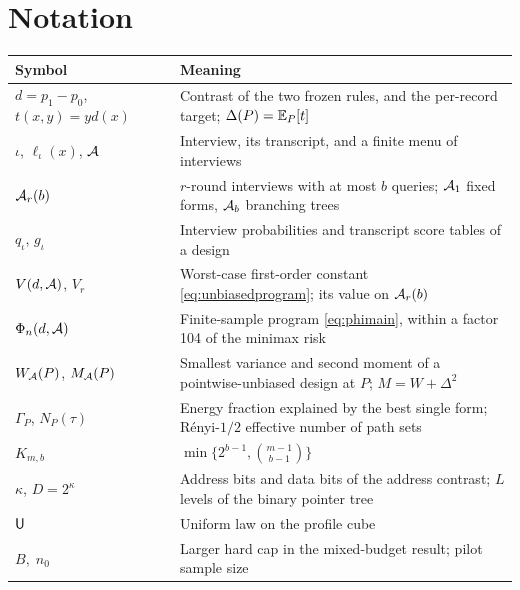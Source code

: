 \section{Notation}\label{app:notation}
\begin{center}\small
\begin{tabular}{lp{10.5cm}}
\toprule
Symbol & Meaning\\
\midrule
$d=p_1-p_0$, $t(x,y)=yd(x)$ & Contrast of the two frozen rules, and the per-record target; $\Delta(P)=\mathbb{E}_P[t]$\\
$\iota$, $\ell_\iota(x)$, $\mathcal A$ & Interview, its transcript, and a finite menu of interviews\\
$\mathcal A_r(b)$ & $r$-round interviews with at most $b$ queries; $\mathcal A_1$ fixed forms, $\mathcal A_b$ branching trees\\
$q_\iota$, $g_\iota$ & Interview probabilities and transcript score tables of a design\\
$V(d,\mathcal A)$, $V_r$ & Worst-case first-order constant \eqref{eq:unbiasedprogram}; its value on $\mathcal A_r(b)$\\
$\Phi_n(d,\mathcal A)$ & Finite-sample program \eqref{eq:phimain}, within a factor 104 of the minimax risk\\
$W_\mathcal A(P)$, $M_\mathcal A(P)$ & Smallest variance and second moment of a pointwise-unbiased design at $P$; $M=W+\Delta^2$\\
$\Gamma_P$, $N_P(\tau)$ & Energy fraction explained by the best single form; R\'enyi-$1/2$ effective number of path sets\\
$K_{m,b}$ & $\min\{2^{b-1},\binom{m-1}{b-1}\}$\\
$\kappa$, $D=2^\kappa$ & Address bits and data bits of the address contrast; $L$ levels of the binary pointer tree\\
$\mathsf U$ & Uniform law on the profile cube\\
$B,\;n_0$ & Larger hard cap in the mixed-budget result; pilot sample size\\
\bottomrule
\end{tabular}
\end{center}





















